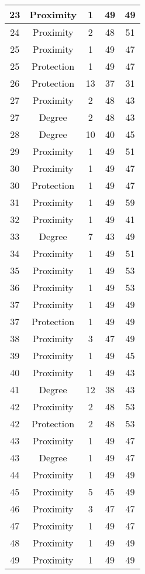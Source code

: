 \documentclass[results.tex]{subfiles}
\begin{document}
\begin{center}
\begin{tabular}{| c || c | c | c | c |}
    \hline
    23 & Proximity & 1 & 49 & 49 \\ 
    \hline
    24 & Proximity & 2 & 48 & 51 \\ 
    \hline
    25 & Proximity & 1 & 49 & 47 \\ 
    \hline
    25 & Protection & 1 & 49 & 47 \\ 
    \hline
    26 & Protection & 13 & 37 & 31 \\ 
    \hline
    27 & Proximity & 2 & 48 & 43 \\ 
    \hline
    27 & Degree & 2 & 48 & 43 \\ 
    \hline
    28 & Degree & 10 & 40 & 45 \\ 
    \hline
    29 & Proximity & 1 & 49 & 51 \\ 
    \hline
    30 & Proximity & 1 & 49 & 47 \\ 
    \hline
    30 & Protection & 1 & 49 & 47 \\ 
    \hline
    31 & Proximity & 1 & 49 & 59 \\ 
    \hline
    32 & Proximity & 1 & 49 & 41 \\ 
    \hline
    33 & Degree & 7 & 43 & 49 \\ 
    \hline
    34 & Proximity & 1 & 49 & 51 \\ 
    \hline
    35 & Proximity & 1 & 49 & 53 \\ 
    \hline
    36 & Proximity & 1 & 49 & 53 \\ 
    \hline
    37 & Proximity & 1 & 49 & 49 \\ 
    \hline
    37 & Protection & 1 & 49 & 49 \\ 
    \hline
    38 & Proximity & 3 & 47 & 49 \\ 
    \hline
    39 & Proximity & 1 & 49 & 45 \\ 
    \hline
    40 & Proximity & 1 & 49 & 43 \\ 
    \hline
    41 & Degree & 12 & 38 & 43 \\ 
    \hline
    42 & Proximity & 2 & 48 & 53 \\ 
    \hline
    42 & Protection & 2 & 48 & 53 \\ 
    \hline
    43 & Proximity & 1 & 49 & 47 \\ 
    \hline
    43 & Degree & 1 & 49 & 47 \\ 
    \hline
    44 & Proximity & 1 & 49 & 49 \\ 
    \hline
    45 & Proximity & 5 & 45 & 49 \\ 
    \hline
    46 & Proximity & 3 & 47 & 47 \\ 
    \hline
    47 & Proximity & 1 & 49 & 47 \\ 
    \hline
    48 & Proximity & 1 & 49 & 49 \\ 
    \hline
    49 & Proximity & 1 & 49 & 49 \\ 
    \hline   \end{tabular}
\end{center}
\end{document}
